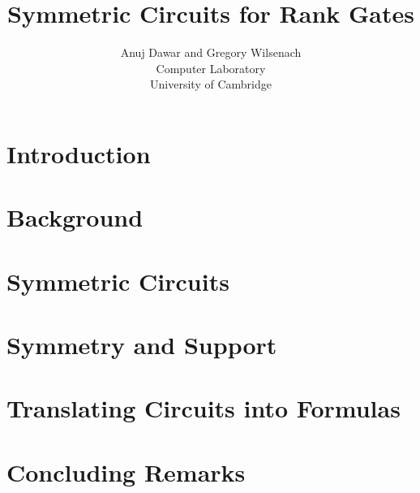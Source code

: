 \documentclass[12pt]{article}
\begin{document}
\title{Symmetric Circuits for Rank Gates}

\author{Anuj Dawar and Gregory Wilsenach \\ 
Computer Laboratory \\
University of Cambridge}

\maketitle

\tableofcontents
\newpage

\section{Introduction}

\newpage

\section{Background}

\newpage

\section{Symmetric Circuits}

\newpage

\section{Symmetry and Support}

\newpage

\section{Translating Circuits into Formulas}

\newpage

\section{Concluding Remarks}

\newpage

 
\end{document}
